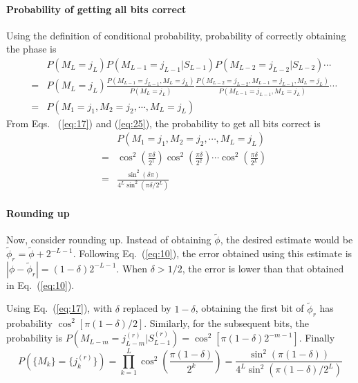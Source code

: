 \documentclass[11pt,oneside,final]{huthesis}%
\begin{document}
\paragraph{Probability of getting all bits correct}
Using the definition of conditional probability, probability of correctly obtaining the phase is
\begin{eqnarray*}
	&& P(M_L=j_L)P(M_{L-1}=j_{L-1}|S_{L-1})P(M_{L-2}=j_{L-2}|S_{L-2})\cdots\\[1.5ex]
	&=& P(M_L=j_L)\frac{P(M_{L-1}=j_{L-1},M_L=j_L)}{P(M_L=j_L)} \frac{P(M_{L-2}=j_{L-2},M_{L-1}=j_{L-1},M_L=j_L)}{P(M_{L-1}=j_{L-1},M_L=j_L)}\cdots\\[1.5ex]
	&=&P(M_{1}=j_1,M_2=j_2,\cdots,M_L=j_L)
\end{eqnarray*}
From Eqs.~%
(\ref{eq:17}) and (\ref{eq:25}), the probability to get all bits correct is
\begin{eqnarray}
&&	P(M_{1}=j_1,M_2=j_2,\cdots,M_L=j_L)\\
&=& 
\cos^2\left(\frac{\pi\delta}{2^1}\right)\cos^2\left(\frac{\pi\delta}{2^{2}}\right)\cdots\cos^2\left(\frac{\pi\delta}{2^{L}}\right)\\
&=& \frac{\sin^2(\delta\pi)}{4^{L}\sin^2(\pi\delta/2^L)}
\label{eq:29}
\end{eqnarray}

\paragraph{Rounding up}
Now, consider rounding up. Instead of obtaining $\tilde{\phi}$, the desired estimate would be $\tilde{\phi}_r=\tilde{\phi}+2^{-L-1}$.  Following Eq.~(\ref{eq:10}), the error obtained using this estimate is $|\phi-\tilde{\phi}_r|=(1-\delta)2^{-L-1}$.   When $\delta>1/2$, the error is lower than that obtained in Eq.~(\ref{eq:10}).  

Using Eq.~(\ref{eq:17}), with $\delta$ replaced by $1-\delta$, obtaining the first bit of $\tilde{\phi}_r$ has probability $\cos^2[\pi(1-\delta)/2]$. 
Similarly, for the subsequent bits, the probability is $P(M_{L-m}=j^{(r)}_{L-m}|S^{(r)}_{L-1})=\cos^2[\pi(1-\delta)2^{-m-1}]$.  Finally%
\begin{equation}
	P(\{M_k\}=\{j^{(r)}_k\})=\prod_{k=1}^L\cos^2\left( \frac{\pi(1-\delta)}{2^{k}}\right)= \frac{\sin^2(\pi(1-\delta))}{4^L\sin^2(\pi(1-\delta)/2^L)}
	\label{eq:30}
\end{equation}
\end{document}

